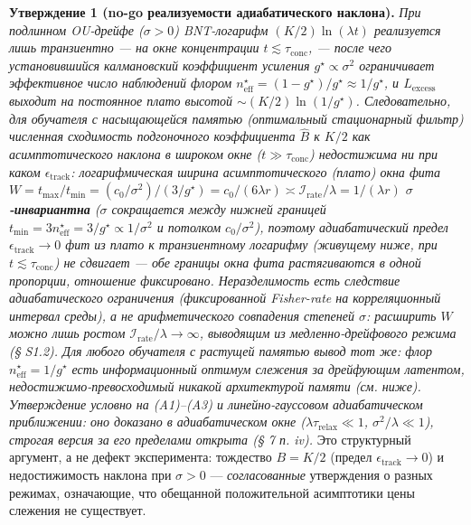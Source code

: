 \documentclass[12pt]{iopart}
\begin{document}
\textbf{Утверждение 1 (no-go реализуемости адиабатического наклона).} \emph{При подлинном OU-дрейфе (\(\sigma > 0\)) BNT-логарифм \((K/2)\ln(\lambda t)\) реализуется лишь транзиентно --- на окне концентрации \(t \lesssim \tau_{\text{conc}}\), --- после чего установившийся калмановский коэффициент усиления \(g^\star \propto \sigma^2\) ограничивает эффективное число наблюдений флором \(n_{\text{eff}}^\star = (1-g^\star)/g^\star \approx 1/g^\star\), и \(L_{\text{excess}}\) выходит на постоянное плато высотой \(\sim (K/2)\ln(1/g^\star)\). Следовательно, для обучателя с насыщающейся памятью (оптимальный стационарный фильтр) численная сходимость подгоночного коэффициента \(\hat B\) к \(K/2\) как асимптотического наклона в широком окне (\(t \gg \tau_{\text{conc}}\)) недостижима ни при каком \(\epsilon_{\text{track}}\): логарифмическая ширина \emph{асимптотического (плато) окна фита} \(W = t_{\max}/t_{\min} = (c_0/\sigma^2)/(3/g^\star) = c_0/(6\lambda r) \asymp \mathcal I_{\text{rate}}/\lambda = 1/(\lambda r)\) \textbf{\(\sigma\)-инвариантна} (\(\sigma\) сокращается между нижней границей \(t_{\min} = 3n_{\text{eff}}^\star = 3/g^\star \propto 1/\sigma^2\) и потолком \(c_0/\sigma^2\)), поэтому адиабатический предел \(\epsilon_{\text{track}}\to0\) фит из плато к транзиентному логарифму (живущему ниже, при \(t\lesssim\tau_{\text{conc}}\)) \emph{не сдвигает} --- обе границы окна фита растягиваются в одной пропорции, отношение фиксировано. Неразделимость есть следствие \emph{адиабатического ограничения} (фиксированной Fisher-rate на корреляционный интервал среды), а не арифметического совпадения степеней \(\sigma\): расширить \(W\) можно лишь ростом \(\mathcal I_{\text{rate}}/\lambda \to \infty\), выводящим из медленно-дрейфового режима (§ S1.2). Для любого обучателя с растущей памятью вывод тот же: флор \(n_{\text{eff}}^\star = 1/g^\star\) есть информационный оптимум слежения за дрейфующим латентом, недостижимо-превосходимый никакой архитектурой памяти (см. ниже). Утверждение условно на (A1)--(A3) и линейно-гауссовом адиабатическом приближении: оно доказано в адиабатическом окне (\(\lambda\tau_{\text{relax}}\ll1\), \(\sigma^2/\lambda\ll1\)), строгая версия за его пределами открыта (§ 7 п. iv).} Это структурный аргумент, а не дефект эксперимента: тождество \(B = K/2\) (предел \(\epsilon_{\text{track}}\to 0\)) и недостижимость наклона при \(\sigma > 0\) --- \emph{согласованные} утверждения о разных режимах, означающие, что обещанной положительной асимптотики цены слежения не существует.
\end{document}
